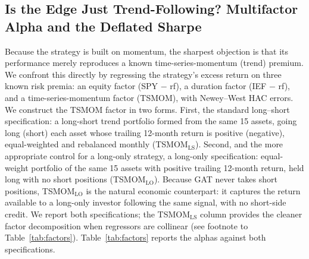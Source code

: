 \subsection{Is the Edge Just Trend-Following? Multifactor Alpha and the Deflated Sharpe}
\label{sec:res_factors}

Because the strategy is built on momentum, the sharpest objection is that its
performance merely reproduces a known time-series-momentum (trend) premium.
We confront this directly by regressing the strategy's excess return on three
known risk premia: an equity factor (SPY $-$ rf), a duration factor
(IEF $-$ rf), and a time-series-momentum factor (TSMOM), with Newey--West HAC
errors.
We construct the TSMOM factor in two forms. First, the standard long--short
specification: a long-short trend portfolio formed from the same 15 assets,
going long (short) each asset whose trailing 12-month return is positive (negative),
equal-weighted and rebalanced monthly (TSMOM$_{\text{LS}}$). Second, and the more
appropriate control for a long-only strategy, a long-only specification:
equal-weight portfolio of the same 15 assets with positive trailing 12-month return,
held long with no short positions (TSMOM$_{\text{LO}}$). Because GAT never takes
short positions, TSMOM$_{\text{LO}}$ is the natural economic counterpart: it captures
the return available to a long-only investor following the same signal, with no
short-side credit. We report both specifications; the TSMOM$_{\text{LS}}$ column
provides the cleaner factor decomposition when regressors are collinear
(see footnote to Table~\ref{tab:factors}). Table~\ref{tab:factors} reports the alphas
against both specifications.

